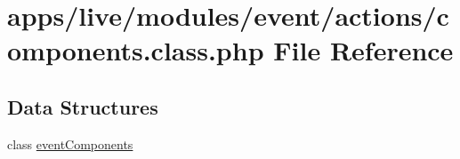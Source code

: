 \hypertarget{live_2modules_2event_2actions_2components_8class_8php}{\section{apps/live/modules/event/actions/components.class.\-php File Reference}
\label{live_2modules_2event_2actions_2components_8class_8php}
}
\subsection*{Data Structures}
\begin{DoxyCompactItemize}
\item 
class \hyperlink{classevent_components}{event\-Components}
\end{DoxyCompactItemize}

